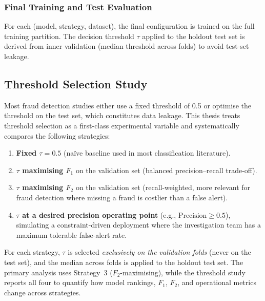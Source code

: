 \subsubsection{Final Training and Test Evaluation}
For each (model, strategy, dataset), the final configuration is trained on the full training partition. The decision threshold $\tau$ applied to the holdout test set is derived from inner validation (median threshold across folds) to avoid test-set leakage.

\subsection{Threshold Selection Study}
\label{sec:threshold_study}

Most fraud detection studies either use a fixed threshold of 0.5 or optimise the threshold on the test set, which constitutes data leakage. This thesis treats threshold selection as a first-class experimental variable and systematically compares the following strategies:

\begin{enumerate}
  \item \textbf{Fixed $\tau = 0.5$} (na\"ive baseline used in most classification literature).
  \item \textbf{$\tau$ maximising $F_1$} on the validation set (balanced precision--recall trade-off).
  \item \textbf{$\tau$ maximising $F_2$} on the validation set (recall-weighted, more relevant for fraud detection where missing a fraud is costlier than a false alert).
  \item \textbf{$\tau$ at a desired precision operating point} (e.g., $\text{Precision} \geq 0.5$), simulating a constraint-driven deployment where the investigation team has a maximum tolerable false-alert rate.
\end{enumerate}

For each strategy, $\tau$ is selected \emph{exclusively on the validation folds} (never on the test set), and the median across folds is applied to the holdout test set. The primary analysis uses Strategy~3 ($F_2$-maximising), while the threshold study reports all four to quantify how model rankings, $F_1$, $F_2$, and operational metrics change across strategies.

